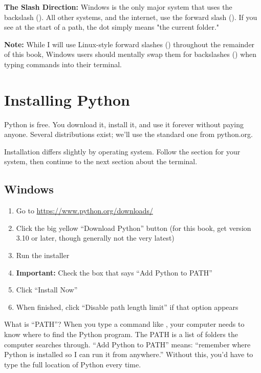 \begin{osbox}
\textbf{The Slash Direction:} Windows is the only major system that uses the backslash (\filepath{\textbackslash}). All other systems, and the internet, use the forward slash (\filepath{/}). If you see  at the start of a path, the dot simply means "the current folder." 

\textbf{Note:} While I will use Linux-style forward slashes (\filepath{/}) throughout the remainder of this book, Windows users should mentally swap them for backslashes (\filepath{\textbackslash}) when typing commands into their terminal.
\end{osbox}

\section{Installing Python}
\label{sec:install-python}

Python is free. You download it, install it, and use it forever without paying anyone. Several distributions exist; we'll use the standard one from python.org.

\begin{osbox}
Installation differs slightly by operating system. Follow the section for your system, then continue to the next section about the terminal.
\end{osbox}

\subsection{Windows}

\begin{enumerate}
    \item Go to \url{https://www.python.org/downloads/}
    \item Click the big yellow ``Download Python'' button (for this book, get version 3.10 or later, though generally not the very latest)
    \item Run the installer
    \item \textbf{Important:} Check the box that says ``Add Python to PATH''
    \item Click ``Install Now''
    \item When finished, click ``Disable path length limit'' if that option appears
\end{enumerate}

\begin{note}
What is ``PATH''? When you type a command like , your computer needs to know where to find the Python program. The PATH is a list of folders the computer searches through. ``Add Python to PATH'' means: ``remember where Python is installed so I can run it from anywhere.'' Without this, you'd have to type the full location of Python every time.
\end{note}

